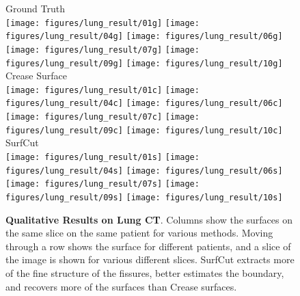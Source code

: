 \documentclass[10pt,journal,compsoc]{IEEEtran}
\begin{document}
\def\fHeightLungResult{0.88in}
\begin{figure}
  \centering
  {Ground Truth \\
    \texttt{[image: figures/lung\_result/01g]} 
    \texttt{[image: figures/lung\_result/04g]} 
    \texttt{[image: figures/lung\_result/06g]} 
    \texttt{[image: figures/lung\_result/07g]} 
    \texttt{[image: figures/lung\_result/09g]} 
    \texttt{[image: figures/lung\_result/10g]} \\
    Crease Surface \\
    \texttt{[image: figures/lung\_result/01c]} 
    \texttt{[image: figures/lung\_result/04c]} 
    \texttt{[image: figures/lung\_result/06c]} 
    \texttt{[image: figures/lung\_result/07c]} 
    \texttt{[image: figures/lung\_result/09c]} 
    \texttt{[image: figures/lung\_result/10c]} \\
    SurfCut \\
    \texttt{[image: figures/lung\_result/01s]} 
    \texttt{[image: figures/lung\_result/04s]} 
    \texttt{[image: figures/lung\_result/06s]} 
    \texttt{[image: figures/lung\_result/07s]} 
    \texttt{[image: figures/lung\_result/09s]} 
    \texttt{[image: figures/lung\_result/10s]} \\
}
\caption{{\bf Qualitative Results on Lung CT}. Columns show the
  surfaces on the same slice on the same patient for various
  methods. Moving through a row shows the surface for different
  patients, and a slice of the image is shown for various different
  slices. SurfCut extracts more of the fine structure of the fissures,
  better estimates the boundary, and recovers more of the surfaces
  than Crease surfaces.}
\label{fig:lung_result}
\end{figure}
\end{document}
